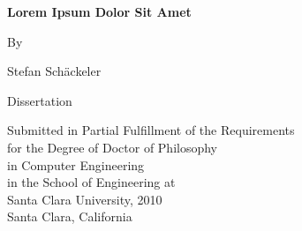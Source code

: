 \newpage\thispagestyle{empty}%


\begin{center}
\vspace*{15mm}
\bf
{\Large Lorem Ipsum Dolor Sit Amet}

\par\vspace{8mm}
By 

\par\vspace{8mm}
Stefan Sch\"ackeler

\par\vspace{50mm}
Dissertation
\end{center}

\vspace{20mm}

\begin{center}
Submitted in Partial Fulfillment of the Requirements\\
for the Degree of Doctor of Philosophy\\
in Computer Engineering\\
in the School of Engineering at\\
Santa Clara University, 2010\\

\vspace{20mm}
Santa Clara, California


\end{center}

